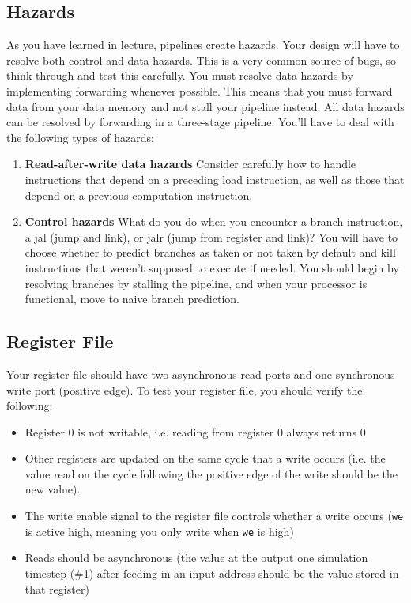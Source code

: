 \documentclass[11pt]{article}
\begin{document}
\subsection{Hazards}
As you have learned in lecture, pipelines create hazards. Your design will have to resolve both control and data hazards. This is a very common source of bugs, so think through and test this carefully. You must resolve data hazards by implementing forwarding whenever possible. This means that you must forward data from your data memory and not stall your pipeline instead. All data hazards can be resolved by forwarding in a three-stage pipeline. You'll have to deal with the following types of hazards:
\begin{enumerate}
	\item \textbf{Read-after-write data hazards} Consider carefully how to handle instructions that depend on a preceding load instruction, as well as those that depend on a previous computation instruction.
	\item \textbf{Control hazards} What do you do when you encounter a branch instruction, a jal (jump and link), or jalr (jump from register and link)? You will have to choose whether to predict branches as taken or not taken by default and kill instructions that weren't supposed to execute if needed. You should begin by resolving branches by stalling the pipeline, and when your processor is functional, move to naive branch prediction.
\end{enumerate}

\subsection{Register File}
\label{reg_file}

Your register file should have two asynchronous-read ports and one synchronous-write port (positive edge). To test your register file, you should verify the following:
\begin{itemize}
	\item Register 0 is not writable, i.e. reading from register 0 always returns 0
	\item Other registers are updated on the same cycle that a write occurs (i.e. the value read on the cycle following the positive edge of the write should be the new value).
	\item The write enable signal to the register file controls whether a write occurs (\verb|we| is active high, meaning you only write when \verb|we| is high)
	\item Reads should be asynchronous (the value at the output one simulation timestep (\#1) after feeding in an input address should be the value stored in that register)
\end{itemize}
\end{document}
